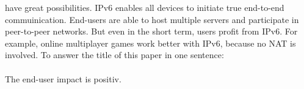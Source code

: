 \documentclass[format=sigconf, natbib=true, nonacm=true]{acmart}
\begin{document}
have great possibilities. IPv6 enables all devices to initiate true end-to-end commuinication. End-users are able to host multiple servers and participate in peer-to-peer networks. But even in the short term, users profit from IPv6. For example, online multiplayer games work better with IPv6, because no NAT is involved. To answer the title of this paper in one sentence:\\\\The end-user impact is positiv.

    
    
\end{document}
